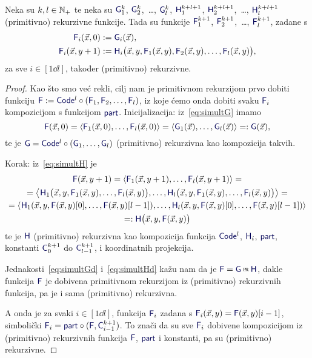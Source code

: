 \begin{propozicija}[{name=[o simultanoj rekurziji]}]\label{prop:simultrek}
    Neka su $k,l\in{\mathbb N}_+$ te neka su $\f G_1^k$, $\f G_2^k$,~\ldots, $\f G_l^k$, $\f H_1^{k+l+1}$, $\f H_2^{k+l+1}$,~\ldots, $\f H_l^{k+l+1}$ (primitivno) rekurzivne funkcije.  Tada su funkcije $\f F_1^{k+1}$, $\f F_2^{k+1}$,~\ldots, $\f F_l^{k+1}$, zadane s
\begin{align}
    \label{eq:simultG}\f F_i(\vec x,0)&:=\f G_i(\vec x)\text,\\
    \label{eq:simultH}
    \f F_i(\vec x,y+1)&:=\f H_i\bigl(\vec x,y,\f F_1(\vec x,y),\f F_2(\vec x,y),\dotsc,\f F_l(\vec x,y)\bigr)\text,
\end{align}
za sve $i\in[1\dd l]$, također (primitivno) rekurzivne.
\end{propozicija}
\begin{proof}
Kao što smo već rekli, cilj nam je primitivnom rekurzijom prvo dobiti funkciju $\f F:=\f{Code}^l\circ(\f F_1,\f F_2,\dotsc,\f F_l)$, iz koje ćemo onda dobiti svaku $\f F_i$ kompozicijom s funkcijom $\f{part}$. Inicijalizacija: iz~\eqref{eq:simultG} imamo
\begin{equation}\label{eq:simultGd}
    \f F(\vec x,0)=\langle \f F_1(\vec x,0),\dotsc,\f F_l(\vec x,0)\rangle=\langle \f G_1(\vec x),\dotsc,\f G_l(\vec x)\rangle=:\f G(\vec x)\text,
\end{equation}
te je $\f G=\f{Code}^l\circ(\f G_1,\dotsc,\f G_l)$ (primitivno) rekurzivna kao kompozicija takvih.
	
\noindent Korak: iz~\eqref{eq:simultH} je
\begin{multline}\label{eq:simultHd}
\f F(\vec x,y+1)=\langle\f F_1(\vec x,y+1),\dotsc,\f F_l(\vec x,y+1)\rangle=\\
	=\bigl\langle\mspace{1mu}\f H_1\bigl(\vec x,y,\f F_1(\vec x,y),\dotsc,\f F_l(\vec x,y)\bigr),\dotsc,\f H_l\bigl(\vec x,y,\f F_1(\vec x,y),\dotsc,\f F_l(\vec x,y)\bigr)\bigr\rangle=\\
	=\langle\mspace{1mu}
\f H_1(\vec x,y,
\f F(\vec x,y)[0],
\dotsc,
\f F(\vec x,y)[l-1]),
\dotsc,
\f H_l(\vec x,y,
\f F(\vec x,y)[0],
\dotsc,
\f F(\vec x,y)[l-1])\rangle\\
=:\f H\bigl(\vec x,y,\f F(\vec x,y)\bigr)
\end{multline}
te je $\f H$ (primitivno) rekurzivna kao kompozicija funkcija $\f{Code}^l$, $\f H_i$, $\f{part}$, konstanti $\f C_0^{k+1}$ do $\f C_{l-1}^{k+1}$, i koordinatnih projekcija.

Jednakosti~\eqref{eq:simultGd} i~\eqref{eq:simultHd} kažu nam da je $\f F=\f G\pr\f H$, dakle funkcija $\f F$ je dobivena primitivnom rekurzijom iz (primitivno) rekurzivnih funkcija, pa je i sama (primitivno) rekurzivna.

A onda je za svaki $i\in[1\dd l]$, funkcija $\f F_i$ zadana s $\f F_i(\vec x, y)=\f F(\vec x,y)[i-1]$, simbolički $\f F_i=\f{part}\circ(\f F,\f C_{i-1}^{k+1})$. To znači da su sve $\f F_i$ dobivene kompozicijom iz (primitivno) rekurzivnih funkcija $\f F$, $\f{part}$ i konstanti, pa su (primitivno) rekurzivne.
\end{proof}

